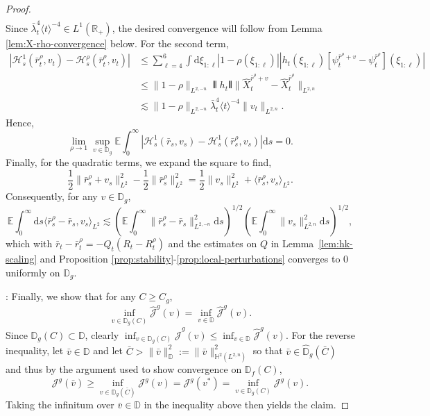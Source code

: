 \documentclass[11pt, a4paper]{scrartcl}
\numberwithin{equation}{section}
\theoremstyle{plain}
\theoremstyle{remark}
\newcommand{\assign}{:=}
\newcommand{\mathd}{\mathrm{d}}
\newcommand{\tmtextit}[1]{\text{{\itshape{#1}}}}
\begin{document}
\begin{proof}
\[\begin{aligned}
     \end{aligned} \]
  Since $\bar{\lambda}_t^4 \langle t \rangle^{- 4} \in L^1 (\mathbb{R}_+)$, the
  desired convergence will follow from Lemma \ref{lem:X-rho-convergence}
  below. For the second term,
  \[ \begin{aligned}
       | \mathcal{H}_s^1 (\bar{r}^{\rho}_t, v_t) -\mathcal{H}_s^{\rho}
       (\bar{r}^{\rho}_t, v_t) | &\leqslant  \sum_{\ell = 4}^6 \int \mathd
       \xi_{1 : \ell} | 1 - \rho (\xi_{1 : \ell}) |  | h_t (\xi_{1 : \ell})
       [\psi^{\bar{r}^{\rho} + v}_t - \psi^{\bar{r}^{\rho}}_t] (\xi_{1 :
       \ell}) |\\
       &\leqslant  \| 1 - \rho \|_{L^{2, - n}} \interleave h_t \interleave 
       \| \hat{X}_t^{\bar{r}^{\rho} + v} - \hat{X}_t^{\bar{r}^{\rho}}
       \|_{L^{2, n}}\\
       & \lesssim  \| 1 - \rho \|_{L^{2, - n}} \bar{\lambda}_t^4 \langle t
       \rangle^{- 4}  \| v_t \|_{L^{2, n}} .
     \end{aligned} \]
  Hence,
  \[ \lim_{\rho \rightarrow 1} \sup_{v \in \mathbb{D}_g} \mathbb{E}
     \int_0^{\infty} | \mathcal{H}_s^1 (\bar{r}_s, v_s) -\mathcal{H}_s^1
     (\bar{r}^{\rho}_s, v_s) | \mathd s = 0. \]
  Finally, for the quadratic terms, we expand the square to find,
  \[ \frac{1}{2} \| \bar{r}^{\rho}_s + v_s \|^2_{L^2} - \frac{1}{2} \|
     \bar{r}^{\rho}_s \|^2_{L^2} = \frac{1}{2} \| v_s \|^2_{L^2} + \langle
     \bar{r}^{\rho}_s, v_s \rangle_{L^2} . \]
  Consequently, for any $v \in \mathbb{D}_g$,
  \[ \mathbb{E} \int_0^{\infty} \mathd s \langle \bar{r}^{\rho}_s -
     \bar{r}_s, v_s \rangle_{L^2} \lesssim \left( \mathbb{E} \int_0^{\infty}
     \| \bar{r}^{\rho}_s - \bar{r}_s \|^2_{L^{2, - n}} \mathd s \right)^{1 /
     2} \left( \mathbb{E} \int_0^{\infty} \| v_s \|^2_{L^{2, n}} \mathd s
     \right)^{1 / 2}, \]
  which with $\bar{r}_t - \bar{r}^{\rho}_t = - Q_t (R_t - R_t^{\rho})$ and the
  estimates on $Q$ in Lemma~\ref{lem:hk-scaling} and Proposition
  \ref{prop:stability}-\ref{prop:local-perturbations} converges to $0$
  uniformly on $\mathbb{D}_g$.
  
  \tmtextit{Recovering the full domain}: Finally, we show that for any $C
  \geqslant C_g$,
  \[ \inf_{v \in \mathbb{D}_g (C)}  \hat{\mathcal{J}}^g (v) = \inf_{v \in
     \mathbb{D}}  \hat{\mathcal{J}}^g (v) . \]
  Since $\mathbb{D}_g (C) \subset \mathbb{D}$, clearly $\inf_{v \in
  \mathbb{D}_g (C)}  \hat{\mathcal{J}}^g (v) \leqslant \inf_{v \in \mathbb{D}}
  \hat{\mathcal{J}}^g (v)$. For the reverse inequality, let $\bar{v} \in
  \mathbb{D}$ and let $\bar{C} > \| \bar{v} \|^2_{\mathbb{D}} \assign \|
  \bar{v} \|^2_{\mathbb{H}^2 (L^{2, n})}$ so that $\bar{v} \in
  \hat{\mathbb{D}}_g (\bar{C})$ and thus by the argument used to show
  convergence on $\mathbb{D}_f (C)$,
  \[ \mathcal{J}^g (\bar{v}) \geqslant \inf_{v \in \mathbb{D}_g (\bar{C})}
     \mathcal{J}^g (v) =\mathcal{J}^g (v^{\ast}) = \inf_{v \in \mathbb{D}_g
     (C)} \mathcal{J}^g (v) . \]
  Taking the infinitum over $\bar{v} \in \mathbb{D}$ in the inequality above
  then yields the claim.
\end{proof}
\end{document}
